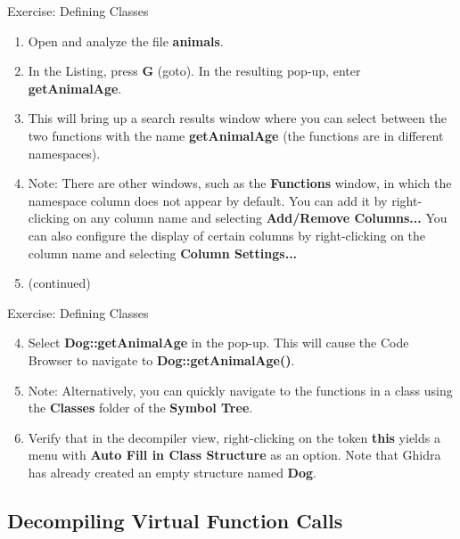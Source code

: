\documentclass{beamer}
\begin{document}
\begin{frame}
\begin{block}{Exercise: Defining Classes}
\begin{enumerate}
\item Open and analyze the file \textbf{animals}.
\item In the Listing, press \textbf{G} (goto).  In the resulting pop-up, enter \textbf{getAnimalAge}.  \item This will bring up a search results window where you can 
select between the two functions with the name \textbf{getAnimalAge} (the functions are in different namespaces).
\item[] Note: There are other windows, such as the \textbf{Functions} window, in which the namespace column does not appear by default.  You can add it by right-clicking 
on any column name and selecting \textbf{Add/Remove Columns...}  You can also configure the display of certain columns by right-clicking on the column name and selecting \textbf{Column Settings...}
\item[] (continued)
\end{enumerate}
\end{block}
\end{frame}

\begin{frame}
\begin{block}{Exercise: Defining Classes}
\begin{enumerate}
\setcounter{enumi}{3}
\item Select \textbf{Dog::getAnimalAge} in the pop-up. This will cause the Code Browser to navigate to \textbf{Dog::getAnimalAge()}.
\item[] Note: Alternatively, you can quickly navigate to the functions in a class using the \textbf{Classes} folder of the \textbf{Symbol Tree}.
\item Verify that in the decompiler view, right-clicking on the token \textbf{this} yields a menu with \textbf{Auto Fill in Class Structure} as an option.  
Note that Ghidra has already created an empty structure named \textbf{Dog}.
\end{enumerate}
\end{block}
\end{frame}

\subsection{Decompiling Virtual Function Calls}
\end{document}
